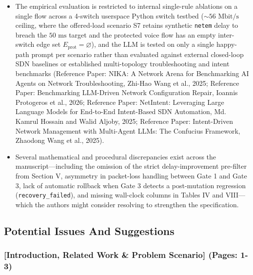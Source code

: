 \documentclass[11pt,a4paper]{article}
\begin{document}
\begin{itemize}[leftmargin=1.8em,itemsep=2pt]
\item The empirical evaluation is restricted to internal single-rule ablations on a single flow across a 4-switch userspace Python switch testbed ($\sim 56\text{ Mbit/s}$ ceiling, where the offered-load scenario S7 retains synthetic \texttt{netem} delay to breach the $50\text{ ms}$ target and the protected voice flow has an empty inter-switch edge set $E_{\text{prot}} = \varnothing$), and the LLM is tested on only a single happy-path prompt per scenario rather than evaluated against external closed-loop SDN baselines or established multi-topology troubleshooting and intent benchmarks (Reference Paper: NIKA: A Network Arena for Benchmarking AI Agents on Network Troubleshooting, Zhi-Hao Wang et al., 2025; Reference Paper: Benchmarking LLM-Driven Network Configuration Repair, Ioannis Protogeros et al., 2026; Reference Paper: NetIntent: Leveraging Large Language Models for End-to-End Intent-Based SDN Automation, Md. Kamrul Hossain and Walid Aljoby, 2025; Reference Paper: Intent-Driven Network Management with Multi-Agent LLMs: The Confucius Framework, Zhaodong Wang et al., 2025).
\item Several mathematical and procedural discrepancies exist across the manuscript—including the omission of the strict delay-improvement pre-filter from Section V, asymmetry in packet-loss handling between Gate 1 and Gate 3, lack of automatic rollback when Gate 3 detects a post-mutation regression (\texttt{recovery\_failed}), and missing wall-clock columns in Tables IV and VIII—which the authors might consider resolving to strengthen the specification.
\end{itemize}
\subsection*{Potential Issues And Suggestions}
\subsubsection*{[Introduction, Related Work \& Problem Scenario] (Pages: 1-3)}
\end{document}
